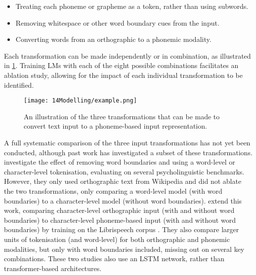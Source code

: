 \begin{itemize}
\setlength\itemsep{0.1em}
    \item {} Treating each phoneme or grapheme as a token, rather than using subwords.
    \item {} Removing whitespace or other word boundary cues from the input.
    \item {} Converting words from an orthographic to a phonemic modality. 
\end{itemize}

Each transformation can be made independently or in combination, as illustrated in \cref{fig:14-example}. Training LMs with each of the eight possible combinations facilitates an ablation study, allowing for the impact of each individual transformation to be identified. %

\begin{figure}[t]
    \centering
    \texttt{[image: 14Modelling/example.png]}
    \caption{An illustration of the three transformations that can be made to convert text input to a phoneme-based input representation.}
    \label{fig:14-example}
\end{figure}

A full systematic comparison of the three input transformations has not yet been conducted, although past work has investigated a subset of these transformations.  \citet{hahn-baroni-2019-tabula} investigate the effect of removing word boundaries and using a word-level or character-level tokenisation, evaluating on several psycholinguistic benchmarks. However, they only used orthographic text from Wikipedia and did not ablate the two transformations, only comparing a word-level model (with word boundaries) to a character-level model (without word boundaries). \citet{nguyen-2022-word-boundaries} extend this work, comparing character-level orthographic input (with and without word boundaries) to character-level phoneme-based input (with and without word boundaries) by training on the Librispeech corpus \citep{panayotov2015librispeech}. They also compare larger units of tokenisation (\bpe and word-level) for both orthographic and phonemic modalities, but only with word boundaries included, missing out on several key combinations. These two studies also use an LSTM network, rather than transformer-based architectures.

